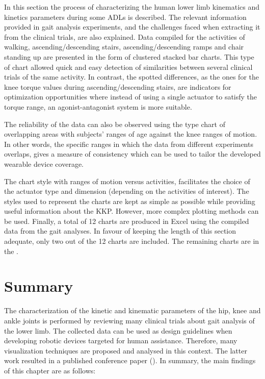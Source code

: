 In this section the process of characterizing the human lower limb kinematics and kinetics parameters during some ADLs is described. The relevant information provided in gait analysis experiments, and the challenges faced when extracting it from the clinical trials, are also explained. Data compiled for the activities of walking, ascending/descending stairs, ascending/descending ramps and chair standing up are presented in the form of clustered stacked bar charts. This type of chart allowed quick and easy detection of similarities between several clinical trials of the same activity. In contrast, the spotted differences, as the ones for the knee torque values during ascending/descending stairs, are indicators for optimization opportunities where instead of using a single actuator to satisfy the torque range, an agonist-antagonist system is more suitable.

The reliability of the data can also be observed using the type chart of overlapping areas with subjects' ranges of age against the knee ranges of motion. In other words, the specific ranges in which the data from different experiments overlaps, gives a measure of consistency which can be used to tailor the developed wearable device coverage. 

The chart style with ranges of motion versus activities, facilitates the choice of the actuator type and dimension (depending on the activities of interest). The styles used to represent the charts are kept as simple as possible while providing useful information about the KKP. However, more complex plotting methods can be used. Finally, a total of 12 charts are produced in Excel\textregistered{} using the compiled data from the gait analyses. In favour of keeping the length of this section adequate, only two out of the 12 charts are included. The remaining charts are in the .

\section{Summary}

The characterization of the kinetic and kinematic parameters of the hip, knee and ankle joints is performed by reviewing many clinical trials about gait analysis of the lower limb. The collected data can be used as design guidelines when developing robotic devices targeted for human assistance. Therefore, many visualization techniques are proposed and analysed in this context. The latter work resulted in a published conference paper (). In summary, the main findings of this chapter are as follows:

